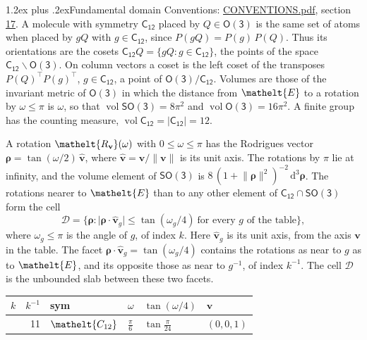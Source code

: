 \documentclass[10pt,a4paper]{article}
\makeatletter
\renewcommand\section{\@startsection{section}{1}{\z@}{-3ex plus -1ex minus -.2ex}%
  {1.2ex plus .2ex}{\normalfont\large\sffamily\bfseries\color{parttitle}}}
\numberwithin{equation}{section}
\newcommand{\eltfont}[1]{{\let\sigma\eltsigma\mathelt{#1}}}
\newcommand{\grp}[1]{\mathsf{#1}}
\newcommand{\cls}[1]{\eltfont{#1}}
\newcommand{\elt}[1]{\eltfont{#1}}
\newcommand{\dirvec}[3]{(#1, #2, #3)}
\newcommand{\unitaxis}{\hat{\mathbf{v}}}
\newcommand{\vv}{\mathbf{v}}
\newcommand{\diff}{\mathrm{d}}
\newcommand{\vol}{\operatorname{vol}}
\newcommand{\rodrigues}{\boldsymbol{\rho}}
\newcommand{\fcell}{\mathcal{D}}
\makeatother
\begin{document}
\section{Fundamental domain}\label{s:fundamental_domain}
Conventions: \href{../../CONVENTIONS.pdf}{CONVENTIONS.pdf}, section \href{../../CONVENTIONS.pdf\#conv.17}{17}.
\leavevmode\label{n:element.placement}A molecule with symmetry $\grp{C_{12}}$ placed by $Q \in \grp{O(3)}$ is the same set of atoms when placed by $gQ$ with $g \in \grp{C_{12}}$, since $P(gQ) = P(g)\,P(Q)$. \label{n:operator.cosets}Thus its orientations are the cosets $\grp{C_{12}}Q = \{gQ : g \in \grp{C_{12}}\}$, the points of the space $\grp{C_{12}}\backslash\grp{O(3)}$. On column vectors a coset is the left coset of the transposes $P(Q)^{\top}P(g)^{\top}$, $g \in \grp{C_{12}}$, a point of $\grp{O(3)}/\grp{C_{12}}$.
\leavevmode\label{n:operator.volume}Volumes are those of the invariant metric of \href{O3.pdf}{$\grp{O(3)}$} in which the distance from $\elt{E}$ to a rotation by $\omega \le \pi$ is $\omega$, so that $\vol\grp{SO(3)} = 8\pi^2$ and $\vol\grp{O(3)} = 16\pi^2$. A finite group has the counting measure, $\vol\grp{C_{12}} = |\grp{C_{12}}| = 12$.

\leavevmode\label{n:vector.rodrigues}\label{n:vector.unitaxis}A rotation $\elt{R_{\vv}}(\omega)$ with $0 \le \omega \le \pi$ has the Rodrigues vector $\rodrigues = \tan(\omega/2)\,\unitaxis$, where $\unitaxis = \vv/\lVert\vv\rVert$ is its unit axis. The rotations by $\pi$ lie at infinity, and the volume element of \href{SO3.pdf}{$\grp{SO(3)}$} is $8\,(1 + \lVert\rodrigues\rVert^2)^{-2}\,\diff^3\rodrigues$.
\leavevmode\label{n:set.cell}The rotations nearer to $\elt{E}$ than to any other element of $\grp{C_{12}} \cap \grp{SO(3)}$ form the cell
\begin{equation}\label{e:cell}\fcell = \bigl\{\rodrigues : \lvert\rodrigues\cdot\unitaxis_g\rvert \le \tan(\omega_g/4)\ \text{for every $g$ of the table}\bigr\},\end{equation}
where $\omega_g \le \pi$ is the angle of $g$, of index $k$. Here $\unitaxis_g$ is its unit axis, from the axis $\vv$ in the table. The facet $\rodrigues\cdot\unitaxis_g = \tan(\omega_g/4)$ contains the rotations as near to $g$ as to $\elt{E}$, and its opposite those as near to $g^{-1}$, of index $k^{-1}$. The cell $\fcell$ is the unbounded slab between these two facets.
{\small{\renewcommand{\arraystretch}{1.3}\begin{longtable}{@{}rrllll@{}}\toprule
$k$ & $k^{-1}$ & sym & $\omega$ & $\tan(\omega/4)$ & $\vv$\\\midrule\endhead
\bottomrule\endfoot\endlastfoot
1 & 11 & $\cls{C_{12}}$ & $\tfrac{\pi}{6}$ & $\tan\tfrac{\pi}{24}$ & $\dirvec{0}{0}{1}$\\
\bottomrule\end{longtable}}}
\end{document}
